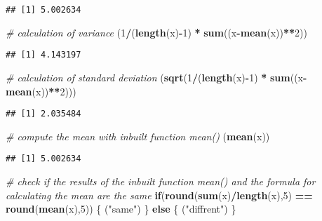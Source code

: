 \documentclass[
]{article}
\newenvironment{Shaded}{\begin{snugshade}}{\end{snugshade}}
\newcommand{\CommentTok}[1]{\textcolor[rgb]{0.56,0.35,0.01}{\textit{#1}}}
\newcommand{\ControlFlowTok}[1]{\textcolor[rgb]{0.13,0.29,0.53}{\textbf{#1}}}
\newcommand{\DecValTok}[1]{\textcolor[rgb]{0.00,0.00,0.81}{#1}}
\newcommand{\KeywordTok}[1]{\textcolor[rgb]{0.13,0.29,0.53}{\textbf{#1}}}
\newcommand{\NormalTok}[1]{#1}
\newcommand{\OperatorTok}[1]{\textcolor[rgb]{0.81,0.36,0.00}{\textbf{#1}}}
\newcommand{\StringTok}[1]{\textcolor[rgb]{0.31,0.60,0.02}{#1}}
\begin{document}
\begin{verbatim}
## [1] 5.002634
\end{verbatim}

\begin{Shaded}
\begin{Highlighting}[]
\CommentTok{# calculation of variance}
\NormalTok{(}\DecValTok{1}\OperatorTok{/}\NormalTok{(}\KeywordTok{length}\NormalTok{(x)}\OperatorTok{-}\DecValTok{1}\NormalTok{) }\OperatorTok{*}\StringTok{ }\KeywordTok{sum}\NormalTok{((x}\OperatorTok{-}\KeywordTok{mean}\NormalTok{(x))}\OperatorTok{**}\DecValTok{2}\NormalTok{))}
\end{Highlighting}
\end{Shaded}

\begin{verbatim}
## [1] 4.143197
\end{verbatim}

\begin{Shaded}
\begin{Highlighting}[]
\CommentTok{# calculation of standard deviation}
\NormalTok{(}\KeywordTok{sqrt}\NormalTok{(}\DecValTok{1}\OperatorTok{/}\NormalTok{(}\KeywordTok{length}\NormalTok{(x)}\OperatorTok{-}\DecValTok{1}\NormalTok{) }\OperatorTok{*}\StringTok{ }\KeywordTok{sum}\NormalTok{((x}\OperatorTok{-}\KeywordTok{mean}\NormalTok{(x))}\OperatorTok{**}\DecValTok{2}\NormalTok{)))}
\end{Highlighting}
\end{Shaded}

\begin{verbatim}
## [1] 2.035484
\end{verbatim}

\begin{Shaded}
\begin{Highlighting}[]
\CommentTok{# compute the mean with inbuilt function mean()}
\NormalTok{(}\KeywordTok{mean}\NormalTok{(x))}
\end{Highlighting}
\end{Shaded}

\begin{verbatim}
## [1] 5.002634
\end{verbatim}

\begin{Shaded}
\begin{Highlighting}[]
\CommentTok{# check if the results of the inbuilt function mean() and the formula for calculating the mean are the same }
\ControlFlowTok{if}\NormalTok{(}\KeywordTok{round}\NormalTok{(}\KeywordTok{sum}\NormalTok{(x)}\OperatorTok{/}\KeywordTok{length}\NormalTok{(x),}\DecValTok{5}\NormalTok{) }\OperatorTok{==}\StringTok{ }\KeywordTok{round}\NormalTok{(}\KeywordTok{mean}\NormalTok{(x),}\DecValTok{5}\NormalTok{)) \{}
\NormalTok{  (}\StringTok{"same"}\NormalTok{)}
\NormalTok{\} }\ControlFlowTok{else}\NormalTok{ \{}
\NormalTok{  (}\StringTok{"diffrent"}\NormalTok{)}
\NormalTok{\}  }
\end{Highlighting}
\end{Shaded}
\end{document}
